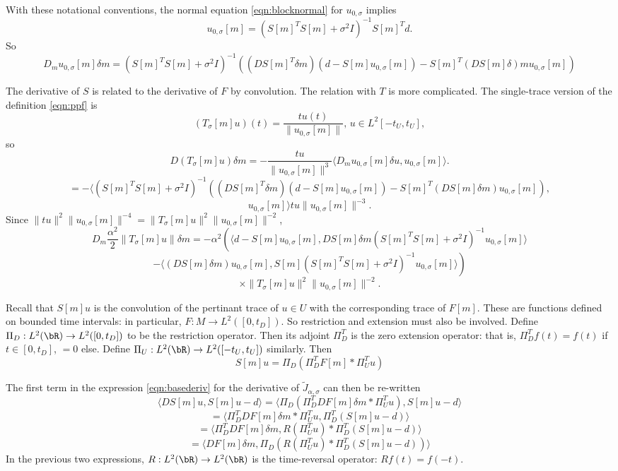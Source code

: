 With these notational conventions, the normal equation \ref{eqn:blocknormal} for $u_{0,\sigma}$ implies
\begin{equation}
  \label{eqn:blocksingle}
  u_{0,\sigma}[m] = (S[m]^TS[m] + \sigma^2I)^{-1}S[m]^Td.
\end{equation}
So
\begin{equation}
  \label{eqn:blockderiv}
  D_mu_{0,\sigma}[m] \delta m = (S[m]^TS[m] + \sigma^2I)^{-1}((DS[m]^{T}\delta m) (d - S[m]u_{0,\sigma}[m]) - S[m]^T(DS[m]\delta) m u_{0,\sigma}[m])
\end{equation}

The derivative of $S$ is related to the derivative of $F$ by convolution. The relation with $T$ is more complicated.
The single-trace version of the definition \ref{eqn:ppf} is
\[
  (T_{\sigma}[m]u)(t) = \frac{t u(t)}{\|u_{0,\sigma}[m]\|},\,u \in L^2[-t_U,t_U],
\]
so
\[
D(T_{\sigma}[m] u)\delta m = -\frac{t u}{\|u_{0,\sigma}[m]\|^3}\langle D_mu_{0,\sigma}[m]\delta u, u_{0,\sigma}[m]\rangle.
\]
\[
  =-\langle  (S[m]^TS[m] + \sigma^2I)^{-1}((DS[m]^{T}\delta m) (d - S[m]u_{0,\sigma}[m]) - S[m]^T(DS[m]\delta m) u_{0,\sigma}[m]),
\]
\[ u_{0,\sigma}[m] \rangle tu \|u_{0,\sigma}[m] \|^{-3}.
\]
Since $\|tu\|^2\| u_{0,\sigma}[m]\|^{-4} = \|T_{\sigma}[m]u\|^2\| u_{0,\sigma}[m]\|^{-2}$,
\[
  D_m \frac{\alpha^2}{2}\|T_{\sigma}[m]u\|\delta m =-\alpha^2\left( \langle d-S[m]u_{0,\sigma}[m], DS[m]\delta m (S[m]^TS[m] + \sigma^2I)^{-1}u_{0,\sigma}[m]\rangle \right.
\]
\[
  \left. - \langle (DS[m]\delta m)u_{0,\sigma}[m],S[m](S[m]^TS[m] + \sigma^2I)^{-1}u_{0,\sigma}[m]\rangle \right)
\]
\[
  \times  \|T_{\sigma}[m]u\|^2\| u_{0,\sigma}[m]\|^{-2}.
\]

Recall that $S[m]u$ is the convolution of the pertinant trace of $u \in U$ with the corresponding trace of $F[m]$. These are functions defined on bounded time intervals: in particular, $F:M \rightarrow L^2([0,t_D])$. So restriction and extension must also be involved. Define $\Pi_D: L^2(\bR) \rightarrow L^2([0,t_D])$ to be the restriction operator. Then its adjoint $\Pi_D^T$ is the zero extension operator: that is, $\Pi_D^Tf(t) = f(t)$ if $t \in [0,t_D]$, $= 0$ else. Define $\Pi_U:  L^2(\bR) \rightarrow L^2([-t_U,t_U])$ similarly. Then
\begin{equation}
  \label{eqn:sdefsingle}
  S[m]u = \Pi_D(\Pi_D^TF[m] * \Pi_U^Tu)
\end{equation}

The first term in the expression \ref{eqn:basederiv} for the derivative of $\tilde{J}_{\alpha,\sigma}$ can then be re-written
\[
  \langle DS[m]u, S[m]u-d\rangle = \langle \Pi_D(\Pi_D^TDF[m]\delta m * \Pi_U^Tu), S[m]u-d\rangle
\]
\[
  = \langle \Pi_D^TDF[m]\delta m * \Pi_U^Tu, \Pi_D^T (S[m]u-d) \rangle
\]
\[
  = \langle \Pi_D^TDF[m]\delta m,  R(\Pi_U^Tu)*\Pi_D^T (S[m]u-d) \rangle
\]
\begin{equation}
  \label{eqn:firstsingle}
  = \langle DF[m]\delta m, \Pi_D(R(\Pi_U^Tu)*\Pi_D^T (S[m]u-d))\rangle
\end{equation}
In the previous two expressions, $R: L^2(\bR) \rightarrow L^2(\bR)$ is the time-reversal operator: $Rf(t) = f(-t)$.

